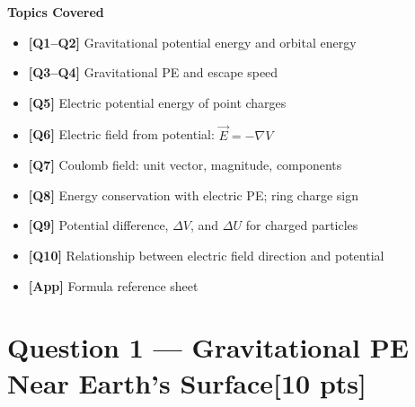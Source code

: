\documentclass[12pt,letterpaper]{article}
\newcommand{\pts}[1]{\hfill\textcolor{TorontoBlue60}{[#1 pts]}}
\begin{document}
\begin{titlepage}
\begin{center}
  \vspace{0.8cm}

  {\bfseries\color{TorontoBlue} Topics Covered}\\[0.4cm]
  \begin{minipage}{0.85\linewidth}
  \begin{itemize}[leftmargin=1.5em, itemsep=4pt]
    \item[\textcolor{TorontoBlue}{$\triangleright$}] \textbf{[Q1--Q2]} Gravitational potential energy and orbital energy
    \item[\textcolor{TorontoBlue}{$\triangleright$}] \textbf{[Q3--Q4]} Gravitational PE and escape speed
    \item[\textcolor{TorontoBlue}{$\triangleright$}] \textbf{[Q5]} Electric potential energy of point charges
    \item[\textcolor{TorontoBlue}{$\triangleright$}] \textbf{[Q6]} Electric field from potential: $\vec{E} = -\nabla V$
    \item[\textcolor{TorontoBlue}{$\triangleright$}] \textbf{[Q7]} Coulomb field: unit vector, magnitude, components
    \item[\textcolor{TorontoBlue}{$\triangleright$}] \textbf{[Q8]} Energy conservation with electric PE; ring charge sign
    \item[\textcolor{TorontoBlue}{$\triangleright$}] \textbf{[Q9]} Potential difference, $\Delta V$, and $\Delta U$ for charged particles
    \item[\textcolor{TorontoBlue}{$\triangleright$}] \textbf{[Q10]} Relationship between electric field direction and potential
    \item[\textcolor{TorontoBlue}{$\triangleright$}] \textbf{[App]} Formula reference sheet
  \end{itemize}
  \end{minipage}
\end{center}
\vfill
\end{titlepage}

\tableofcontents
\newpage

\section{Question 1 --- Gravitational PE Near Earth's Surface\pts{10}}
\label{sec:q1}
\end{document}
